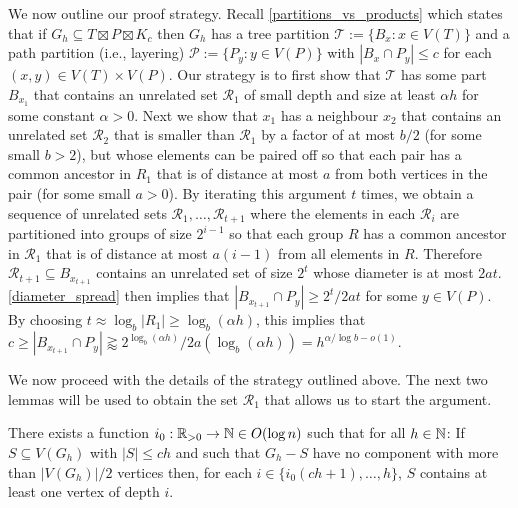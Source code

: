 \documentclass{patmorin}
\renewcommand{\le}{\leqslant}
\renewcommand{\ge}{\geqslant}
\begin{document}

We now outline our proof strategy.  Recall \cref{partitions_vs_products} which states that if $G_h\subseteq T\boxtimes P\boxtimes K_c$ then $G_h$ has a tree partition $\mathcal{T}:=\{B_x:x\in V(T)\}$ and a path partition (i.e., layering) $\mathcal{P}:=\{P_y:y\in V(P)\}$ with $|B_x\cap P_y|\le c$ for each $(x,y)\in V(T)\times V(P)$. Our strategy is to first show that $\mathcal{T}$ has some part $B_{x_1}$ that contains an unrelated set $\mathcal{R}_1$ of small depth and size at least $\alpha h$ for some constant $\alpha >0$.  Next we show that $x_1$ has a neighbour $x_2$ that contains an unrelated set $\mathcal{R}_2$ that is smaller than $\mathcal{R}_1$ by a factor of at most $b/2$ (for some small $b>2$), but whose elements can be paired off so that each pair has a common ancestor in $R_1$ that is of distance at most $a$ from both vertices in the pair (for some small $a>0$).  By iterating this argument $t$ times, we obtain a sequence of unrelated sets $\mathcal{R}_1,\ldots,\mathcal{R}_{t+1}$ where the elements in each $\mathcal{R}_i$ are partitioned into groups of size $2^{i-1}$ so that each group $R$ has a common ancestor in $\mathcal{R}_1$ that is of distance at most $a(i-1)$ from all elements in $R$.  Therefore $\mathcal{R}_{t+1}\subseteq B_{x_{t+1}}$ contains an unrelated set of size $2^{t}$ whose diameter is at most $2at$.  \cref{diameter_spread} then implies that $|B_{x_{t+1}}\cap P_y|\ge 2^{t}/2at$ for some $y\in V(P)$.  By choosing  $t\approx\log_b |R_1|\ge \log_{b}(\alpha h)$, this implies that $c\ge |B_{x_{t+1}}\cap P_y|\gtrapprox 2^{\log_{b}(\alpha h)}/2a(\log_{b}(\alpha h))=h^{\alpha/\log b-o(1)}$.

We now proceed with the details of the strategy outlined above.  The next two lemmas will be used to obtain the set $\mathcal{R}_1$ that allows us to start the argument.

\begin{lem}\label{small_depth_separator}
  There exists a function $i_0:\mathbb{R}_{>0}\to\mathbb{N}\in O(\log n)$ such that for all $h\in\mathbb{N}$: If $S\subseteq V(G_h)$ with $|S|\le ch$ and such that $G_h-S$ have no component with more than $|V(G_h)|/2$ vertices then, for each $i\in\{i_0(ch+1),\ldots,h\}$, $S$ contains at least one vertex of depth $i$.
\end{lem}
\end{document}
